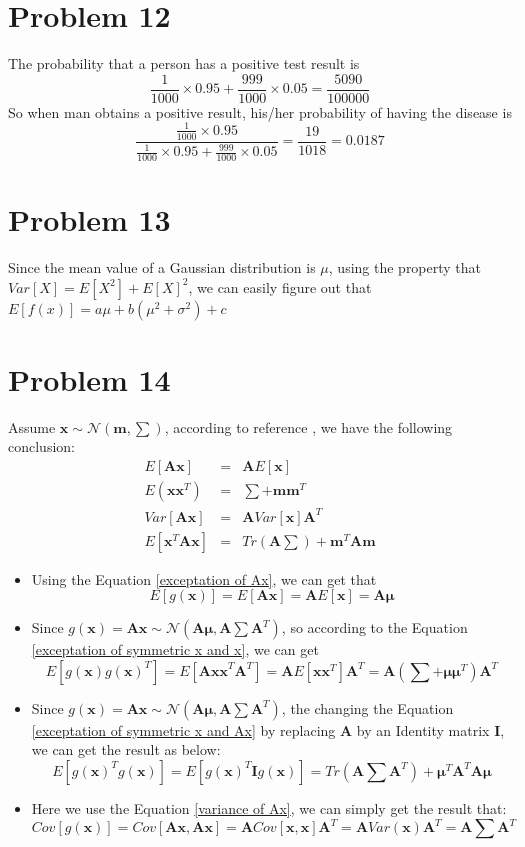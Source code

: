 \documentclass{article}
\begin{document}
\section*{Problem 12}
The probability that a person has a positive test result is
\[ \frac{1}{1000} \times 0.95 + \frac{999}{1000} \times 0.05 = \frac{5090}{100000}\]
So when man obtains a positive result, his/her probability of having the disease is
\[ \frac{\frac{1}{1000} \times 0.95}{\frac{1}{1000} \times 0.95 + \frac{999}{1000} \times 0.05} = \frac{19}{1018} = 0.0187\]

\section*{Problem 13}
Since the mean value of a Gaussian distribution is $\mu$, using the property that $Var[X] = E[X^2] + E[X]^2$, we can easily figure out that
$E[f(x)]=a\mu+b(\mu^2+\sigma^2)+c$

\section*{Problem 14}
Assume $\bm{x} \sim \mathcal{N}(\bm{m}, \sum) $, according to reference \citealp{IMM2012-03274}, we have the following conclusion:
\begin{eqnarray}
E[\bm{Ax}] & = & \bm{A}E[\bm{x}]\label{exceptation of Ax} \\
E(\bm{xx}^T) & = & \sum + \bm{mm}^T\label{exceptation of symmetric x and x} \\
Var[\bm{Ax}] & = & \bm{A}Var[\bm{x}]\bm{A}^T \label{variance of Ax}\\
E[\bm{x}^T\bm{Ax}] & = & Tr(\bm{A}\sum) + \bm{m}^T\bm{Am}\label{exceptation of symmetric x and Ax}
\end{eqnarray}

\begin{itemize}
	\item Using the Equation \ref{exceptation of Ax}, we can get that\[E[g(\bm{x})] = E[\bm{Ax}] = \bm{A}E[\bm{x}] = \bm{A\mu}\]
	
	\item Since $g(\bm{x})=\bm{Ax} \sim \mathcal{N}(\bm{A\mu}, \bm{A}\sum\bm{A}^T) $, so according to the Equation \ref{exceptation of symmetric x and x}, we can get
	\[E[g(\bm{x})g(\bm{x})^T] = E[\bm{Axx}^T\bm{A}^T] = \bm{A}E[\bm{xx}^T]\bm{A}^T = \bm{A}(\sum + \bm{\mu} \bm{\mu}^T)\bm{A}^T \]
	
 	\item Since $g(\bm{x})=\bm{Ax} \sim \mathcal{N}(\bm{A\mu}, \bm{A}\sum\bm{A}^T) $, the changing the Equation \ref{exceptation of symmetric x and Ax} by replacing $\bm{A}$ by an Identity matrix $\bm{I}$, we can get the result as below:
 	\[ E[g(\bm{x})^Tg(\bm{x})] = E[g(\bm{x})^T\bm{I}g(\bm{x})] = Tr(\bm{A} \sum \bm{A}^T) + \bm{\mu}^T\bm{A}^T\bm{A}\bm{\mu}\]
 	
 	\item Here we use the Equation \ref{variance of Ax}, we can simply get the result that:
 	\[Cov[g(\bm{x})] = Cov[\bm{Ax}, \bm{Ax}] = \bm{A}Cov[\bm{x},\bm{x}]\bm{A}^T = \bm{A}Var(\bm{x})\bm{A}^T = \bm{A}\sum \bm{A}^T\]
\end{itemize}

\small


\end{document}

